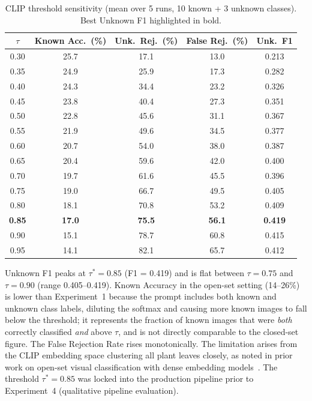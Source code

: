 \begin{table}[h]
    \centering
    \caption{CLIP threshold sensitivity (mean over 5 runs, 10 known + 3 unknown
             classes). Best Unknown F1 highlighted in bold.}
    \label{tab:clip_threshold}
    \begin{tabular}{ccccc}
        \hline
        \textbf{$\tau$} & \textbf{Known Acc.\ (\%)} & \textbf{Unk.\ Rej.\ (\%)} & \textbf{False Rej.\ (\%)} & \textbf{Unk.\ F1} \\
        \hline
        0.30 & 25.7 & 17.1 & 13.0 & 0.213 \\
        0.35 & 24.9 & 25.9 & 17.3 & 0.282 \\
        0.40 & 24.3 & 34.4 & 23.2 & 0.326 \\
        0.45 & 23.8 & 40.4 & 27.3 & 0.351 \\
        0.50 & 22.8 & 45.6 & 31.1 & 0.367 \\
        0.55 & 21.9 & 49.6 & 34.5 & 0.377 \\
        0.60 & 20.7 & 54.0 & 38.0 & 0.387 \\
        0.65 & 20.4 & 59.6 & 42.0 & 0.400 \\
        0.70 & 19.7 & 61.6 & 45.5 & 0.396 \\
        0.75 & 19.0 & 66.7 & 49.5 & 0.405 \\
        0.80 & 18.1 & 70.8 & 53.2 & 0.409 \\
        \textbf{0.85} & \textbf{17.0} & \textbf{75.5} & \textbf{56.1} & \textbf{0.419} \\
        0.90 & 15.1 & 78.7 & 60.8 & 0.415 \\
        0.95 & 14.1 & 82.1 & 65.7 & 0.412 \\
        \hline
    \end{tabular}
\end{table}

Unknown F1 peaks at $\tau^* = 0.85$ (F1 = 0.419) and is flat between
$\tau = 0.75$ and $\tau = 0.90$ (range 0.405--0.419).
Known Accuracy in the open-set setting (14--26\%) is lower than Experiment~1
because the prompt includes both known and unknown class labels, diluting the
softmax and causing more known images to fall below the threshold; it
represents the fraction of known images that were \emph{both} correctly
classified \emph{and} above $\tau$, and is not directly comparable to the
closed-set figure.
The False Rejection Rate rises monotonically. The limitation arises from the CLIP embedding space clustering all plant leaves
closely, as noted in prior work on open-set visual classification with dense
embedding models~\cite{dhamija2020openset}.
The threshold $\tau^* = 0.85$ was locked into the production pipeline prior
to Experiment~4 (qualitative pipeline evaluation).

